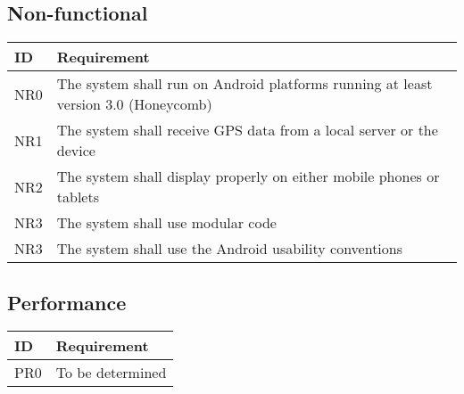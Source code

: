 \documentclass{article}
\begin{document}
\subsection{Non-functional}

\begin{tabular}{ | p{.5in} | p{5in} | }
\hline
\textbf{ID} & \textbf{Requirement}\\
\hline
\hline
NR0 & The system shall run on Android platforms running at least version 3.0 (Honeycomb)\\
\hline
NR1 & The system shall receive GPS data from a local server or the device\\
\hline
NR2 & The system shall display properly on either mobile phones or tablets\\
\hline
NR3 & The system shall use modular code\\
\hline
NR3 & The system shall use the Android usability conventions\\
\hline
\end{tabular}


\subsection{Performance}

\begin{tabular}{ | p{.5in} | p{5in} | }
\hline
\textbf{ID} & \textbf{Requirement}\\
\hline
\hline
PR0 & To be determined\\
\hline
\end{tabular}
\end{document}
